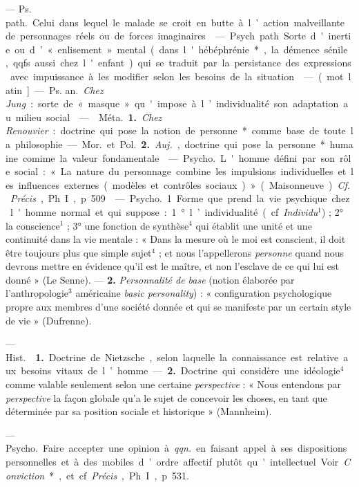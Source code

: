 \begin{itemize}[leftmargin=1cm, label=, itemsep=1pt]
 — \si{Ps. path.} Celui dans lequel le malade se
croit en butte à l’action malveillante de personnages réels ou de forces
imaginaires.

 — Psych. path. Sorte d'inertie ou d’ « enlisement » mental
(dans l'hébéphrénie*, la démence sénile, qqfs. aussi chez l'enfant) qui se
traduit par la persistance des expressions avec impuissance à les modifier
selon les besoins de la situation.

 — (mot latin] — \si{Ps. an.} {\it Chez Jung} : sorte de « masque
» qu'impose à l’individualité son adaptation au milieu social.

 —  \si{Méta.} {\bf 1.} {\it Chez
Renouvier} : doctrine qui pose la notion de personne* comme base de toute la
philosophie. — \si{Mor.} et \si{Pol.}  {\bf 2.} {\it Auj.}, doctrine qui pose
la personne* humaine comime la valeur fondamentale.

 — \si{Psycho.} L'homme défini par son rôle social : « La
nature du personnage combine les impulsions individuelles et les influences
externes (modèles et contrôles sociaux) » (Maisonneuve). {\it Cf.}
{\it Précis}, Ph. I, p. 509.

 — \si{Psycho.} 1. Forme que prend la vie
psychique chez l'homme normal et qui suppose : 1° l’individualité (cf.
{\it Individu}$^1$) ; 2° la conscience$^1$ ; 3° une fonction de synthèse$^4$
qui établit une unité et une continuité dans la vie mentale : « Dans la
mesure où le moi est conscient, il doit être toujours plus que simple
sujet$^4$ ; et nous l’appellerons {\it personne} quand nous devrons mettre en
évidence qu'il est le maître, et non l’esclave de ce qui lui est donné » (Le
Senne). — {\bf 2.} {\it Personnalité
de base} (notion élaborée par l'anthropologie$^3$ américaine {\it basic
personality}) : « configuration psychologique propre aux membres d’une
société donnée et qui se manifeste par un certain style de vie » (Dufrenne).

 — \si{Hist.}  {\bf 1.} Doctrine de
Nietzsche, selon laquelle la connaissance est relative aux besoins vitaux de
l’homme. — {\bf 2.} Doctrine qui considère une idéologie$^4$ comme valable
seulement selon une certaine {\it perspective} : « Nous entendons par
{\it perspective} la façon globale qu’a le sujet de concevoir les choses, en
tant que déterminée par sa position sociale et historique » (Mannheim).

 — \si{Psycho.} Faire accepter une opinion à {\it qqn.} en
faisant appel à ses dispositions personnelles et à des mobiles d’ordre
affectif plutôt qu'intellectuel. Voir {\it Conviction}*, et cf. {\it Précis},
Ph. I, p. 531.


\end{itemize}
